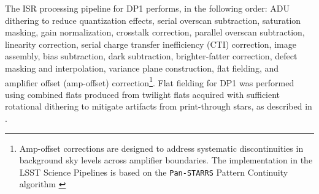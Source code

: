The ISR processing pipeline for DP1 performs, in the following order: ADU dithering to reduce quantization effects, serial overscan subtraction, saturation masking, gain normalization, crosstalk correction, parallel overscan subtraction, linearity correction, serial charge transfer inefficiency (CTI) correction, image assembly, bias subtraction, dark subtraction, brighter-fatter correction, defect masking and interpolation, variance plane construction, flat fielding, and amplifier offset (amp-offset) correction\footnote{Amp-offset corrections are designed to address systematic discontinuities in background sky levels across amplifier boundaries. The implementation in the LSST Science Pipelines is based on the \texttt{Pan-STARRS} Pattern Continuity algorithm \citep{2020ApJS..251....4W}}.
Flat fielding for DP1 was performed using combined flats produced from twilight flats acquired with sufficient rotational dithering to mitigate artifacts from print-through stars, as described in .



